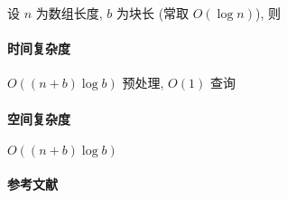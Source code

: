 设 \(n\) 为数组长度, \(b\) 为块长 (常取 \(O(\log n)\)), 则

\paragraph{时间复杂度} \(O((n+b)\log b)\) 预处理, \(O(1)\) 查询

\paragraph{空间复杂度} \(O((n+b)\log b)\)

\paragraph{参考文献} \cite{arlazarov1970yekonomnom} \cite{aho1974design}